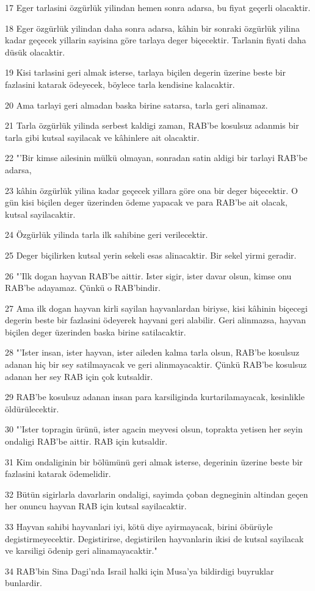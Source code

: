 \par 17 Eger tarlasini özgürlük yilindan hemen sonra adarsa, bu fiyat geçerli olacaktir.
\par 18 Eger özgürlük yilindan daha sonra adarsa, kâhin bir sonraki özgürlük yilina kadar geçecek yillarin sayisina göre tarlaya deger biçecektir. Tarlanin fiyati daha düsük olacaktir.
\par 19 Kisi tarlasini geri almak isterse, tarlaya biçilen degerin üzerine beste bir fazlasini katarak ödeyecek, böylece tarla kendisine kalacaktir.
\par 20 Ama tarlayi geri almadan baska birine satarsa, tarla geri alinamaz.
\par 21 Tarla özgürlük yilinda serbest kaldigi zaman, RAB'be kosulsuz adanmis bir tarla gibi kutsal sayilacak ve kâhinlere ait olacaktir.
\par 22 "'Bir kimse ailesinin mülkü olmayan, sonradan satin aldigi bir tarlayi RAB'be adarsa,
\par 23 kâhin özgürlük yilina kadar geçecek yillara göre ona bir deger biçecektir. O gün kisi biçilen deger üzerinden ödeme yapacak ve para RAB'be ait olacak, kutsal sayilacaktir.
\par 24 Özgürlük yilinda tarla ilk sahibine geri verilecektir.
\par 25 Deger biçilirken kutsal yerin sekeli esas alinacaktir. Bir sekel yirmi geradir.
\par 26 "'Ilk dogan hayvan RAB'be aittir. Ister sigir, ister davar olsun, kimse onu RAB'be adayamaz. Çünkü o RAB'bindir.
\par 27 Ama ilk dogan hayvan kirli sayilan hayvanlardan biriyse, kisi kâhinin biçecegi degerin beste bir fazlasini ödeyerek hayvani geri alabilir. Geri alinmazsa, hayvan biçilen deger üzerinden baska birine satilacaktir.
\par 28 "'Ister insan, ister hayvan, ister aileden kalma tarla olsun, RAB'be kosulsuz adanan hiç bir sey satilmayacak ve geri alinmayacaktir. Çünkü RAB'be kosulsuz adanan her sey RAB için çok kutsaldir.
\par 29 RAB'be kosulsuz adanan insan para karsiliginda kurtarilamayacak, kesinlikle öldürülecektir.
\par 30 "'Ister topragin ürünü, ister agacin meyvesi olsun, toprakta yetisen her seyin ondaligi RAB'be aittir. RAB için kutsaldir.
\par 31 Kim ondaliginin bir bölümünü geri almak isterse, degerinin üzerine beste bir fazlasini katarak ödemelidir.
\par 32 Bütün sigirlarla davarlarin ondaligi, sayimda çoban degneginin altindan geçen her onuncu hayvan RAB için kutsal sayilacaktir.
\par 33 Hayvan sahibi hayvanlari iyi, kötü diye ayirmayacak, birini öbürüyle degistirmeyecektir. Degistirirse, degistirilen hayvanlarin ikisi de kutsal sayilacak ve karsiligi ödenip geri alinamayacaktir."
\par 34 RAB'bin Sina Dagi'nda Israil halki için Musa'ya bildirdigi buyruklar bunlardir.


